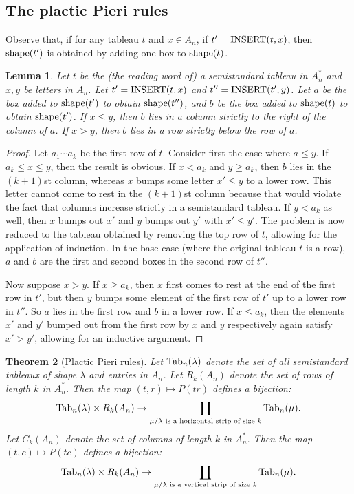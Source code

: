 \documentclass[11pt]{amsart}
\newtheorem{theorem}{Theorem}[subsection]
\newtheorem{lemma}[theorem]{Lemma}
\theoremstyle{definition}
\theoremstyle{example}
\newcommand{\ins}{\textup{INSERT}}
\newcommand{\shape}{\textup{shape}}
\newcommand{\Tab}{\textup{Tab}}
\begin{document}
\subsection{The plactic Pieri rules}
Observe that, if for any tableau $t$ and $x\in A_n$, if $t'=\ins(t,x)$, then $\shape(t')$ is obtained by adding one box to $\shape(t)$.
\begin{lemma}
  \label{lemma:two-step}
  Let $t$ be the (the reading word of) a semistandard tableau in $A_n^*$ and $x,y$ be letters in $A_n$.
  Let $t'=\ins(t,x)$ and $t''=\ins(t',y)$.
  Let $a$ be the box added to $\shape(t')$ to obtain $\shape(t'')$, and $b$ be the box added to $\shape(t)$ to obtain $\shape(t')$.
  If $x\leq y$, then $b$ lies in a column strictly to the right of the column of $a$.
  If $x>y$, then $b$ lies in a row strictly below the row of $a$.
\end{lemma}
\begin{proof}
  Let $a_1\dotsb a_k$ be the first row of $t$.
  Consider first the case where $a\leq y$.
  If $a_k\leq x\leq y$, then the result is obvious.
  If $x<a_k$ and $y\geq a_k$, then $b$ lies in the $(k+1)$st column, whereas $x$ bumps some letter $x'\leq y$ to a lower row.
  This letter cannot come to rest in the $(k+1)$st column because that would violate the fact that columns increase strictly in a semistandard tableau.
  If $y<a_k$ as well, then $x$ bumps out $x'$ and $y$ bumps out $y'$ with $x'\leq y'$.
  The problem is now reduced to the tableau obtained by removing the top row of $t$, allowing for the application of induction.
  In the base case (where the original tableau $t$ is a row), $a$ and $b$ are the first and second boxes in the second row of $t''$.

  Now suppose $x>y$.
  If $x\geq a_k$, then $x$ first comes to rest at the end of the first row in $t'$, but then $y$ bumps some element of the first row of $t'$ up to a lower row in $t''$.
  So $a$ lies in the first row and $b$ in a lower row.
  If $x\leq a_k$, then the elements $x'$ and $y'$ bumped out from the first row by $x$ and $y$ respectively again satisfy $x'>y'$, allowing for an inductive argument.
\end{proof}
\begin{theorem}
  [Plactic Pieri rules]
  \label{theorem:plactic-pieri}
  Let $\Tab_n(\lambda)$ denote the set of all semistandard tableaux of shape $\lambda$ and entries in $A_n$.
  Let $R_k(A_n)$ denote the set of rows of length $k$ in $A_n^*$.
  Then the map $(t,r)\mapsto P(tr)$ defines a bijection:
  \begin{displaymath}
    \Tab_n(\lambda)\times R_k(A_n) \to \coprod_{\mu/\lambda \text{ is a horizontal strip of size $k$}} \Tab_n(\mu).
  \end{displaymath}
  Let $C_k(A_n)$ denote the set of columns of length $k$ in $A_n^*$.
  Then the map $(t,c)\mapsto P(tc)$ defines a bijection:
  \begin{displaymath}
    \Tab_n(\lambda)\times R_k(A_n) \to \coprod_{\mu/\lambda \text{ is a vertical strip of size $k$}} \Tab_n(\mu).
  \end{displaymath}
\end{theorem}
\end{document}
